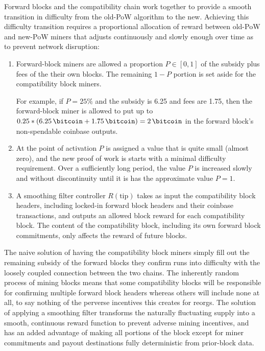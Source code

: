 Forward blocks and the compatibility chain work together to provide a
smooth transition in difficulty from the old-PoW algorithm to the new.
Achieving this difficulty transition requires a proportional
allocation of reward between old-PoW and new-PoW miners that adjusts
continuously and slowly enough over time as to prevent network
disruption:

\begin{enumerate}

  \item

    Forward-block miners are allowed a proportion $P \in [0,1]$ of the
    subsidy plus fees of the their own blocks.  The remaining $1 - P$
    portion is set aside for the compatibility block miners.

    For example, if $P = 25\%$ and the subsidy is \SI{6.25}{\bitcoin}
    and fees are \SI{1.75}{\bitcoin}, then the forward-block miner is
    allowed to put up to $0.25 * (\SI{6.25}{\bitcoin} +
    \SI{1.75}{\bitcoin}) = \SI{2}{\bitcoin}$ in the forward block's
    non-spendable coinbase outputs.

  \item

    At the point of activation $P$ is assigned a value that is quite
    small (almost zero), and the new proof of work is starts with a
    minimal difficulty requirement.  Over a sufficiently long period,
    the value $P$ is increased slowly and without discontinuity until
    it is has the approximate value $P = 1$.

  \item

    A smoothing filter controller $R(\mathrm{tip})$ takes as input the
    compatibility block headers, including locked-in forward block
    headers and their coinbase transactions, and outputs an allowed
    block reward for each compatibility block.  The content of the
    compatibility block, including its own forward block commitments,
    only affects the reward of future blocks.

\end{enumerate}

The naive solution of having the compatibility block miners simply
fill out the remaining subsidy of the forward blocks they confirm runs
into difficulty with the loosely coupled connection between the two
chains.  The inherently random process of mining blocks means that
some compatibility blocks will be responsible for confirming multiple
forward block headers whereas others will include none at all, to say
nothing of the perverse incentives this creates for reorgs.  The
solution of applying a smoothing filter transforms the naturally
fluctuating supply into a smooth, continuous reward function to
prevent adverse mining incentives, and has an added advantage of
making all portions of the block except for miner commitments and
payout destinations fully deterministic from prior-block data.

